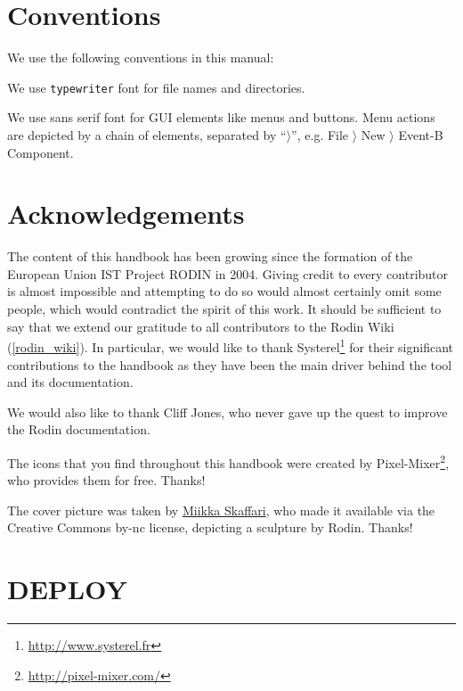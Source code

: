 \documentclass[12pt]{book}
\begin{document}
\section{Conventions}
\label{conventions}

We use the following conventions in this manual:


We use \texttt{typewriter} font for file names and directories.

We use \textsf{sans serif font} for GUI elements like menus and buttons.  Menu actions are depicted by a chain of elements, separated by ``$\rangle$'', e.g. \textsf{File $\rangle$ New $\rangle$ Event-B Component}.

\section{Acknowledgements}
\label{sec:acknowledgements}

The content of this handbook has been growing since the formation of the European Union IST Project RODIN in 2004.  Giving credit to every contributor is almost impossible and attempting to do so would almost certainly omit some people, which would contradict the spirit of this work.  It should be sufficient to say that we extend our gratitude to all contributors to the Rodin Wiki (\ref{rodin_wiki}). In particular, we would like to thank Systerel\footnote{\url{http://www.systerel.fr}} for their significant contributions to the handbook as they have been the main driver behind the tool and its documentation.

We would also like to thank Cliff Jones, who never gave up the quest to improve the Rodin documentation.

The icons that you find throughout this handbook were created by Pixel-Mixer\footnote{\url{http://pixel-mixer.com/}}, who provides them for free.  Thanks!

The cover picture was taken by \href{http://www.flickr.com/photos/miikka_skaffari/4697342246/}{Miikka Skaffari}, who made it available via the Creative Commons by-nc license, depicting a sculpture by Rodin.  Thanks!

\section{DEPLOY}
\label{deploy}
\end{document}
